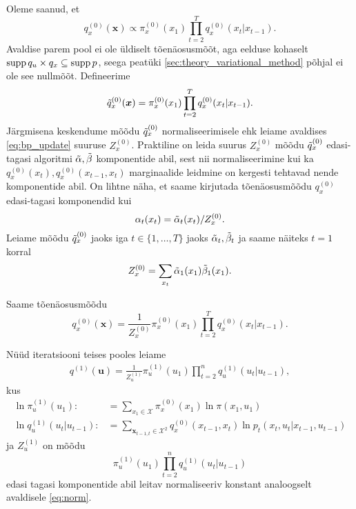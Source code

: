 Oleme saanud, et 
$$q_x^{(0)}(\bm{x}) \propto \pi_x^{(0)}(x_1) \prod_{t=2}^{T}{q_x^{(0)}(x_{t}|x_{t-1})}.$$
Avaldise parem pool ei ole üldiselt tõenäosusmõõt, aga eelduse kohaselt $\operatorname{supp} q_u \times q_x \subseteq \operatorname{supp} p$, seega peatüki \ref{sec:theory_variational_method} põhjal ei ole see nullmõõt. Defineerime
$$\Tilde{q}_x^{(0)}(\bm{x}) = \pi_x^{(0)}(x_1) \prod_{t=2}^{T}{q_x^{(0)}(x_{t}|x_{t-1})}.$$
Järgmisena keskendume mõõdu $\Tilde{q}_x^{(0)}$ normaliseerimisele ehk leiame avaldises \eqref{eq:bp_update} suuruse $Z_x^{(0)}$. Praktiline on leida suurus $Z_x^{(0)}$ mõõdu $\Tilde{q}_x^{(0)}$ edasi-tagasi algoritmi $\Tilde{\alpha}, \Tilde{\beta}$ komponentide abil, sest nii normaliseerimine kui ka $q_x^{(0)}(x_t), q_x^{(0)}(x_{t-1},x_t)$ marginaalide leidmine on kergesti tehtavad nende komponentide abil. On lihtne näha, et saame kirjutada tõenäosusmõõdu $q_x^{(0)}$ edasi-tagasi komponendid kui
$$\alpha_t(x_t) = \Tilde{\alpha}_t(x_t)/Z_x^{(0)}.$$ Leiame mõõdu $\Tilde{q}_x^{(0)}$ jaoks iga $t \in \{1,\ldots,T\}$ jaoks $\Tilde{\alpha}_t, \Tilde{\beta}_t$ ja saame näiteks $t=1$ korral
\begin{equation}
    \label{eq:norm}
    Z_x^{(0)} = \sum_{x_t} \Tilde{\alpha}_1(x_1) \Tilde{\beta}_1(x_1).
\end{equation}

Saame tõenäosusmõõdu
\begin{equation}
    \label{eq:update_is_still_markov}
    q_x^{(0)}(\bm{x}) = \frac{1}{Z_x^{(0)}}\pi_x^{(0)}(x_1)\prod_{t=2}^T q_x^{(0)}(x_t | x_{t-1}).
\end{equation}

Nüüd iteratsiooni teises pooles leiame
\begin{align*}
    q^{(1)}(\bm{u}) = \frac{1}{Z_u^{(1)}}\pi_u^{(1)}(u_1) \prod_{t=2}^n q_u^{(1)}(u_t | u_{t-1}),
\end{align*}
kus 
\begin{align*}
    \ln \pi_u^{(1)}(u_1) :&= \sum_{x_1 \in \mathcal{X}}  \pi_x^{(0)}(x_1) \ln \pi(x_1,u_1) \\
    \ln q_u^{(1)}(u_{t}|u_{t-1}) :&= \sum_{\bm{x}_{t-1,t} \in \mathcal{X}^2}  q_x^{(0)}(x_{t-1}, x_t) \ln p_t(x_{t},u_t | x_{t-1},u_{t-1})
\end{align*}
ja $Z_u^{(1)}$ on mõõdu
$$\pi_u^{(1)}(u_1) \prod_{t=2}^n q_u^{(1)}(u_t | u_{t-1})$$
edasi tagasi komponentide abil leitav normaliseeriv konstant analoogselt avaldisele \eqref{eq:norm}.

